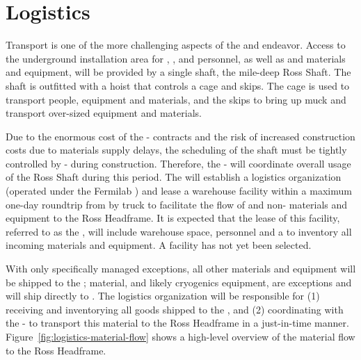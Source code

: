 \section{Logistics}
\label{sec:fdsp-tc-log}


Transport is one of the more challenging aspects of the  and  endeavor.  
Access to the underground installation area for , , and  personnel, as well as   and   materials and equipment, will be provided by a single shaft, the mile-deep Ross Shaft. 
The shaft is outfitted with a hoist that controls a cage and skips. The cage is used to transport people, equipment and materials, and the skips to bring up muck and transport over-sized equipment and materials.

Due to the enormous cost of the - contracts and the risk of increased construction costs due to materials supply delays, the scheduling of the shaft must be tightly controlled by - during construction. Therefore, the -  will coordinate overall usage of the Ross Shaft during this period. The  will establish a logistics organization (operated under the Fermilab ) and lease a warehouse facility within a maximum one-day roundtrip from  by truck to facilitate the flow of   and  non- materials and equipment to the Ross Headframe. It is expected that the lease of this facility, referred to as the , will include warehouse space, personnel and a  to inventory all incoming materials and equipment. 
A facility has not yet been selected. 

With only specifically managed exceptions, all other materials and equipment will be shipped to the ;  material, and likely cryogenics equipment, are exceptions and will ship directly to . 
The logistics  organization will be responsible for (1) receiving and inventorying all  goods shipped to the , and (2) coordinating with the -  to transport this material to the Ross Headframe in a just-in-time manner. 
Figure~\ref{fig:logistics-material-flow} shows a high-level overview of the material flow to the Ross Headframe.


